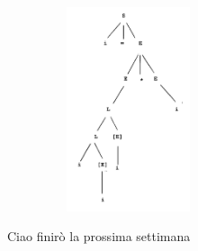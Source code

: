 \documentclass[11pt]{article}
\begin{document}
\begin{center}
  \begin{minipage}[t]{0.4\linewidth}
    \raggedright
    \begin{figure}[H]
      \centering
      \includegraphics[height=6cm, width=5cm]{./img/05DerivationTree.png}
      \label{fig:05-derivation-tree} 
    \end{figure}  
  \end{minipage}
  \begin{minipage}[t]{0.4\linewidth}
    Ciao finirò la prossima settimana
   
  \end{minipage}
\end{center}
\end{document}
